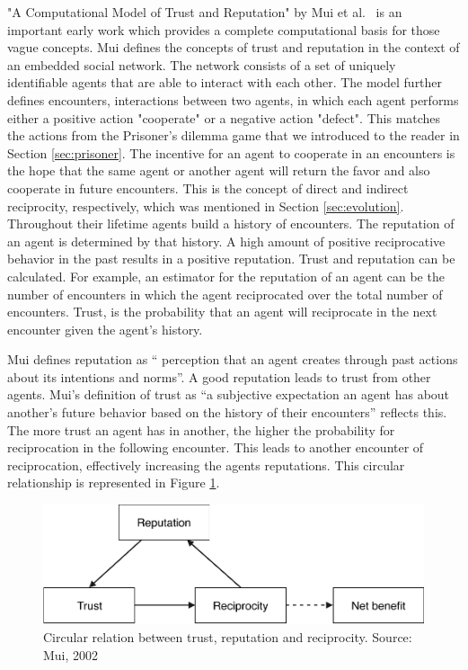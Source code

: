 "A Computational Model of Trust and Reputation" by Mui et al.~\cite{mui2002computational} is an
important early work which provides a complete computational basis for those vague concepts. Mui
defines the concepts of trust and reputation in the context of an embedded social network. The 
network consists of a set of uniquely identifiable agents that are able to interact with each other. 
The model further defines encounters, interactions between two agents, in which each agent performs either a 
positive action "cooperate" or a negative action "defect". This matches the actions from the 
Prisoner's dilemma game that we introduced to the reader in Section \ref{sec:prisoner}. The incentive
for an agent to cooperate in an encounters is the hope that the same agent or another agent will
return the favor and also cooperate in future encounters. This is the concept of direct and indirect
reciprocity, respectively, which was
mentioned in Section \ref{sec:evolution}. Throughout their lifetime agents build a
history of encounters. The reputation of an agent is determined by that history. A high amount of 
positive reciprocative behavior in the past results in a positive reputation. Trust 
and reputation can be calculated. For example, an estimator for the reputation
of an agent can be the number of encounters in which the agent reciprocated over the total number of 
encounters. Trust, is the probability that an agent will reciprocate in the next encounter given 
the agent's history.

Mui defines reputation as ``
perception that an agent creates through past actions about its intentions and norms''. A good 
reputation leads to trust from other agents. Mui's definition of trust as ``a subjective expectation
an agent has about another's future behavior based on the history of their encounters'' reflects
this. The more trust an agent has in another, the higher the probability for reciprocation in the following
encounter. This leads to another encounter of reciprocation, effectively increasing the agents 
reputations. This circular relationship is represented in Figure \ref{fig:mui}. 


\begin{figure}[h!]
    \centering
    \includegraphics[width=\textwidth]{images/mui_figure}
    \caption{Circular relation between trust, reputation and reciprocity. Source: Mui, 2002~\cite{mui2002computational}}
    \label{fig:mui}
\end{figure}

